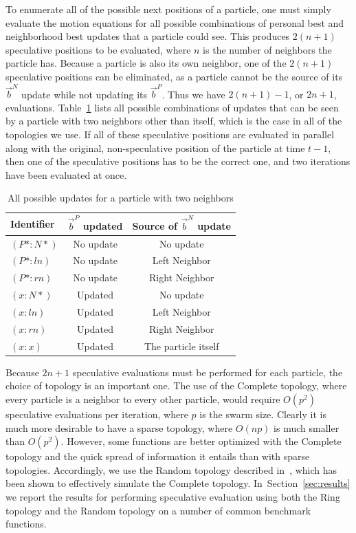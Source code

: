 \documentclass[journal,letterpaper]{IEEEtran}
\renewcommand{\sec}[1]{Section~\ref{sec:#1}}
\providecommand{\pers}{\ensuremath{P}}
\providecommand{\neigh}{\ensuremath{N}}
\providecommand{\nbest}{\ensuremath{\Vec{b}^\neigh}}
\providecommand{\pbest}{\ensuremath{\Vec{b}^\pers}}
\providecommand{\ln}{\ensuremath{ln}}
\providecommand{\rn}{\ensuremath{rn}}
\providecommand{\casexn}{\ensuremath{(x:\neigh*)}}
\providecommand{\casexx}{\ensuremath{(x:x)}}
\providecommand{\casexl}{\ensuremath{(x:\ln)}}
\providecommand{\casexr}{\ensuremath{(x:\rn)}}
\providecommand{\casepn}{\ensuremath{(\pers*:\neigh*)}}
\providecommand{\casepl}{\ensuremath{(\pers*:\ln)}}
\providecommand{\casepr}{\ensuremath{(\pers*:\rn)}}
\begin{document}
To enumerate all of the possible next positions of a particle, one must simply
evaluate the motion equations for all possible combinations of personal best
and neighborhood best updates that a particle could see.  This produces
$2(n+1)$ speculative positions to be evaluated, where $n$ is the number of
neighbors the particle has.  Because a particle is also its own neighbor, one
of the $2(n+1)$ speculative positions can be eliminated, as a particle cannot
be the source of its $\nbest$ update while not updating its $\pbest$.  Thus we
have $2(n+1)-1$, or $2n+1$, evaluations.  Table~\ref{tab:evals} lists all
possible combinations of updates that can be seen by a particle with two
neighbors other than itself, which is the case in all of the topologies we use.
If all of these speculative positions are evaluated in parallel along with the
original, non-speculative position of the particle at time $t-1$, then one of
the speculative positions has to be the correct one, and two iterations have
been evaluated at once.

\begin{table}
  \caption{All possible updates for a particle with two neighbors}
  \label{tab:evals}
  \centering
  \begin{tabular}{lcc}
	Identifier&$\pbest$ updated&Source of $\nbest$ update\\
	\hline
	\hline
	$\casepn$&No update&No update\\
	\hline
	$\casepl$&No update&Left Neighbor\\
	\hline
	$\casepr$&No update&Right Neighbor\\
	\hline
	$\casexn$&Updated&No update\\
	\hline
	$\casexl$&Updated&Left Neighbor\\
	\hline
	$\casexr$&Updated&Right Neighbor\\
	\hline
	$\casexx$&Updated&The particle itself\\
	\hline
  \end{tabular}
\end{table}

Because $2n+1$ speculative evaluations must be performed for each particle, the
choice of topology is an important one.  The use of the Complete topology,
where every particle is a neighbor to every other particle, would require
$O(p^2)$ speculative evaluations per iteration, where $p$ is the swarm size.
Clearly it is much more desirable to have a sparse topology, where $O(np)$ is
much smaller than $O(p^2)$.  However, some functions are better optimized with
the Complete topology and the quick spread of information it entails than with
sparse topologies.  Accordingly, we use the Random topology described
in~\cite{mcnabb-cec09}, which has been shown to effectively simulate the
Complete topology.  In~\sec{results} we report the results for performing
speculative evaluation using both the Ring topology and the Random topology on
a number of common benchmark functions.
\end{document}
